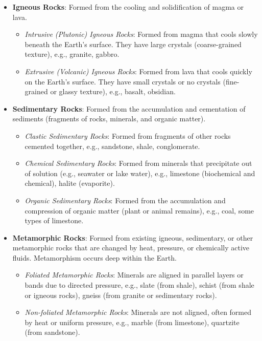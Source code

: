 \begin{itemize}
    \item \textbf{Igneous Rocks}: Formed from the cooling and solidification of magma or lava.
        \begin{itemize}
            \item \textit{Intrusive (Plutonic) Igneous Rocks}: Formed from magma that cools slowly beneath the Earth's surface. They have large crystals (coarse-grained texture), e.g., granite, gabbro.
            \item \textit{Extrusive (Volcanic) Igneous Rocks}: Formed from lava that cools quickly on the Earth's surface. They have small crystals or no crystals (fine-grained or glassy texture), e.g., basalt, obsidian.
        \end{itemize}
    \item \textbf{Sedimentary Rocks}: Formed from the accumulation and cementation of sediments (fragments of rocks, minerals, and organic matter).
        \begin{itemize}
            \item \textit{Clastic Sedimentary Rocks}: Formed from fragments of other rocks cemented together, e.g., sandstone, shale, conglomerate.
            \item \textit{Chemical Sedimentary Rocks}: Formed from minerals that precipitate out of solution (e.g., seawater or lake water), e.g., limestone (biochemical and chemical), halite (evaporite).
            \item \textit{Organic Sedimentary Rocks}: Formed from the accumulation and compression of organic matter (plant or animal remains), e.g., coal, some types of limestone.
        \end{itemize}
    \item \textbf{Metamorphic Rocks}: Formed from existing igneous, sedimentary, or other metamorphic rocks that are changed by heat, pressure, or chemically active fluids. Metamorphism occurs deep within the Earth.
        \begin{itemize}
            \item \textit{Foliated Metamorphic Rocks}:  Minerals are aligned in parallel layers or bands due to directed pressure, e.g., slate (from shale), schist (from shale or igneous rocks), gneiss (from granite or sedimentary rocks).
            \item \textit{Non-foliated Metamorphic Rocks}:  Minerals are not aligned, often formed by heat or uniform pressure, e.g., marble (from limestone), quartzite (from sandstone).
        \end{itemize}
\end{itemize}

